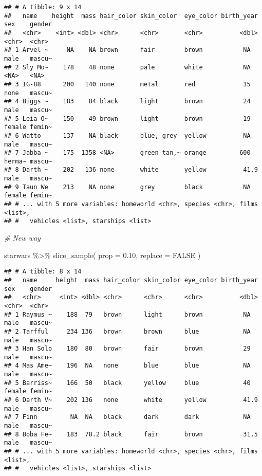 \documentclass[
]{book}
\newenvironment{Shaded}{\begin{snugshade}}{\end{snugshade}}
\newcommand{\AttributeTok}[1]{\textcolor[rgb]{0.77,0.63,0.00}{#1}}
\newcommand{\CommentTok}[1]{\textcolor[rgb]{0.56,0.35,0.01}{\textit{#1}}}
\newcommand{\ConstantTok}[1]{\textcolor[rgb]{0.00,0.00,0.00}{#1}}
\newcommand{\FloatTok}[1]{\textcolor[rgb]{0.00,0.00,0.81}{#1}}
\newcommand{\FunctionTok}[1]{\textcolor[rgb]{0.00,0.00,0.00}{#1}}
\newcommand{\NormalTok}[1]{#1}
\newcommand{\SpecialCharTok}[1]{\textcolor[rgb]{0.00,0.00,0.00}{#1}}
\begin{document}
\begin{verbatim}
## # A tibble: 9 x 14
##   name    height  mass hair_color skin_color  eye_color birth_year sex    gender
##   <chr>    <int> <dbl> <chr>      <chr>       <chr>          <dbl> <chr>  <chr> 
## 1 Arvel ~     NA    NA brown      fair        brown           NA   male   mascu~
## 2 Sly Mo~    178    48 none       pale        white           NA   <NA>   <NA>  
## 3 IG-88      200   140 none       metal       red             15   none   mascu~
## 4 Biggs ~    183    84 black      light       brown           24   male   mascu~
## 5 Leia O~    150    49 brown      light       brown           19   female femin~
## 6 Watto      137    NA black      blue, grey  yellow          NA   male   mascu~
## 7 Jabba ~    175  1358 <NA>       green-tan,~ orange         600   herma~ mascu~
## 8 Darth ~    202   136 none       white       yellow          41.9 male   mascu~
## 9 Taun We    213    NA none       grey        black           NA   female femin~
## # ... with 5 more variables: homeworld <chr>, species <chr>, films <list>,
## #   vehicles <list>, starships <list>
\end{verbatim}

\begin{Shaded}
\begin{Highlighting}[]
\CommentTok{\# New way}

\NormalTok{starwars }\SpecialCharTok{\%\textgreater{}\%}
  \FunctionTok{slice\_sample}\NormalTok{(}
    \AttributeTok{prop =} \FloatTok{0.10}\NormalTok{,}
    \AttributeTok{replace =} \ConstantTok{FALSE}
\NormalTok{  )}
\end{Highlighting}
\end{Shaded}

\begin{verbatim}
## # A tibble: 8 x 14
##   name     height  mass hair_color skin_color eye_color birth_year sex    gender
##   <chr>     <int> <dbl> <chr>      <chr>      <chr>          <dbl> <chr>  <chr> 
## 1 Raymus ~    188  79   brown      light      brown           NA   male   mascu~
## 2 Tarfful     234 136   brown      brown      blue            NA   male   mascu~
## 3 Han Solo    180  80   brown      fair       brown           29   male   mascu~
## 4 Mas Ame~    196  NA   none       blue       blue            NA   male   mascu~
## 5 Barriss~    166  50   black      yellow     blue            40   female femin~
## 6 Darth V~    202 136   none       white      yellow          41.9 male   mascu~
## 7 Finn         NA  NA   black      dark       dark            NA   male   mascu~
## 8 Boba Fe~    183  78.2 black      fair       brown           31.5 male   mascu~
## # ... with 5 more variables: homeworld <chr>, species <chr>, films <list>,
## #   vehicles <list>, starships <list>
\end{verbatim}
\end{document}
